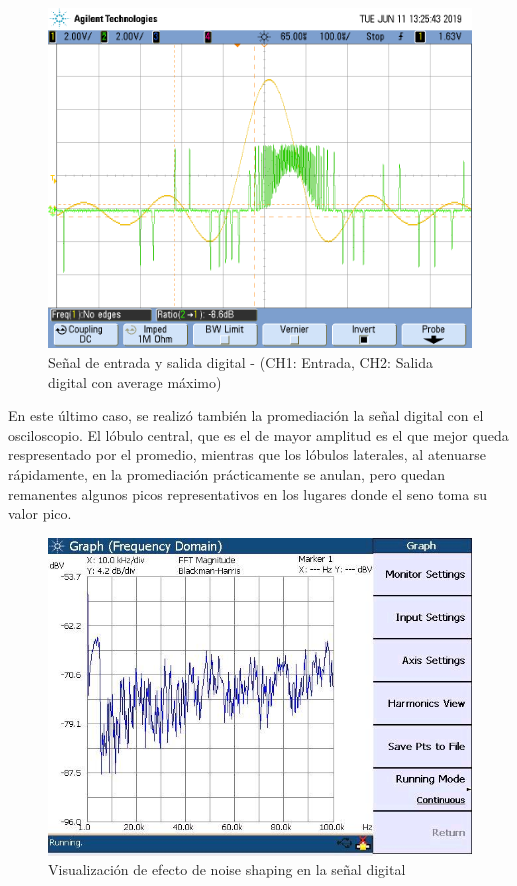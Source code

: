 \documentclass[assd_tp3_main.tex]{subfiles}
\begin{document}
\begin{figure}[!ht]
\begin{centering}
\includegraphics[scale=0.25]{../EJ4/Mediciones/Sinc/s3_4.png}
\par\end{centering}
\caption{Señal de entrada y salida digital - (CH1: Entrada, CH2: Salida digital con average máximo)}
\end{figure}

En este último caso, se realizó también la promediación la señal digital con el osciloscopio. El lóbulo central, que es el de mayor amplitud es el que mejor queda respresentado por el promedio, mientras que los lóbulos laterales, al atenuarse rápidamente, en la promediación prácticamente se anulan, pero quedan remanentes algunos picos representativos en los lugares donde el seno toma su valor pico.

\begin{figure}[!ht]
\begin{centering}
\includegraphics[scale=0.5]{../EJ4/Mediciones/Sinc/s3_ns.jpeg}
\par\end{centering}
\caption{Visualización de efecto de noise shaping en la señal digital}
\end{figure}
\end{document}
